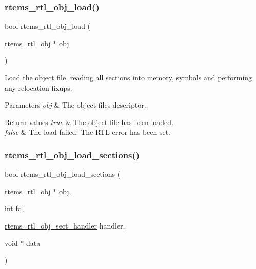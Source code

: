 \subsubsection{\texorpdfstring{rtems\_rtl\_obj\_load()}{rtems\_rtl\_obj\_load()}}
{\footnotesize\ttfamily bool rtems\+\_\+rtl\+\_\+obj\+\_\+load (\begin{DoxyParamCaption}\item[{\mbox{\hyperlink{structrtems__rtl__obj}{rtems\+\_\+rtl\+\_\+obj}} $\ast$}]{obj }\end{DoxyParamCaption})}

Load the object file, reading all sections into memory, symbols and performing any relocation fixups.


\begin{DoxyParams}{Parameters}
{\em obj} & The object file\textquotesingle{}s descriptor. \\
\hline
\end{DoxyParams}

\begin{DoxyRetVals}{Return values}
{\em true} & The object file has been loaded. \\
\hline
{\em false} & The load failed. The R\+TL error has been set. \\
\hline
\end{DoxyRetVals}
\mbox{\label{rtl-obj_8c_aac7c6817d06d317f301538bcf30ffa9f}} 
\subsubsection{\texorpdfstring{rtems\_rtl\_obj\_load\_sections()}{rtems\_rtl\_obj\_load\_sections()}}
{\footnotesize\ttfamily bool rtems\+\_\+rtl\+\_\+obj\+\_\+load\+\_\+sections (\begin{DoxyParamCaption}\item[{\mbox{\hyperlink{structrtems__rtl__obj}{rtems\+\_\+rtl\+\_\+obj}} $\ast$}]{obj,  }\item[{int}]{fd,  }\item[{\mbox{\hyperlink{rtl-obj_8h_a7af5827cf336da33eef4564a6e00ba11}{rtems\+\_\+rtl\+\_\+obj\+\_\+sect\+\_\+handler}}}]{handler,  }\item[{void $\ast$}]{data }\end{DoxyParamCaption})}

